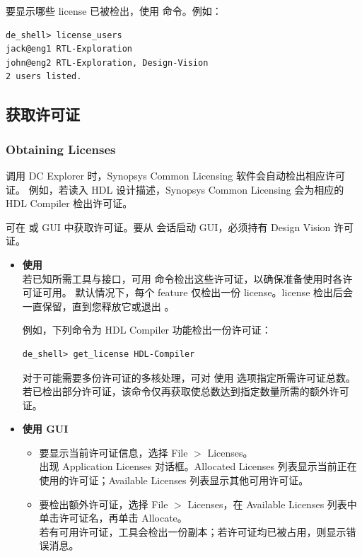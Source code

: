 要显示哪些 license 已被检出，使用  命令。例如：
\begin{lstlisting}
de_shell> license_users
jack@eng1 RTL-Exploration
john@eng2 RTL-Exploration, Design-Vision
2 users listed.
\end{lstlisting}

\subsection{获取许可证}
\subsubsection*{Obtaining Licenses}

调用 DC Explorer 时，Synopsys Common Licensing 软件会自动检出相应许可证。
例如，若读入 HDL 设计描述，Synopsys Common Licensing 会为相应的 HDL Compiler 检出许可证。

可在  或 GUI 中获取许可证。要从  会话启动 GUI，必须持有 Design Vision 许可证。

\begin{itemize}
  \item \textbf{使用 }\\
        若已知所需工具与接口，可用  命令检出这些许可证，以确保准备使用时各许可证可用。
默认情况下，每个 feature 仅检出一份 license。license 检出后会一直保留，直到您释放它或退出 。

        例如，下列命令为 HDL Compiler 功能检出一份许可证：
\begin{lstlisting}
de_shell> get_license HDL-Compiler
\end{lstlisting}
        对于可能需要多份许可证的多核处理，可对  使用  选项指定所需许可证总数。
        若已检出部分许可证，该命令仅再获取使总数达到指定数量所需的额外许可证。

  \item \textbf{使用 GUI}
  \begin{itemize}
    \item 要显示当前许可证信息，选择 File $>$ Licenses。\\
          出现 Application Licenses 对话框。Allocated Licenses 列表显示当前正在使用的许可证；Available Licenses 列表显示其他可用许可证。
    \item 要检出额外许可证，选择 File $>$ Licenses，在 Available Licenses 列表中单击许可证名，再单击 Allocate。\\
          若有可用许可证，工具会检出一份副本；若许可证均已被占用，则显示错误消息。
  \end{itemize}
\end{itemize}


